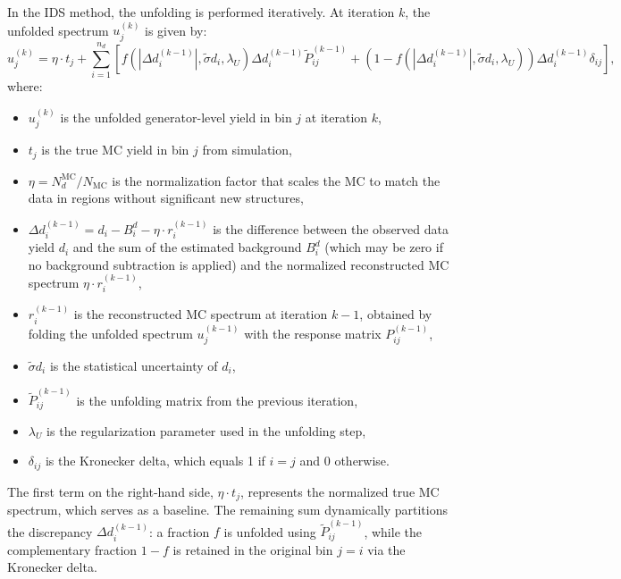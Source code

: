 In the IDS method, the unfolding is performed iteratively. At iteration $k$,
the unfolded spectrum $u_j^{(k)}$ is given by:
\begin{equation}
    u_j^{(k)} = \eta \cdot t_j + \sum_{i=1}^{n_d} \left[ f\left(|\Delta d_i^{(k-1)}|, \tilde{\sigma} d_i, \lambda_U\right) \Delta d_i^{(k-1)} \tilde{P}_{ij}^{(k-1)} + \left(1 - f\left(|\Delta d_i^{(k-1)}|, \tilde{\sigma} d_i, \lambda_U\right)\right) \Delta d_i^{(k-1)} \delta_{ij} \right],
    \label{eq:ids_unfolding}
\end{equation}
where:
\begin{itemize}
    \item $u_j^{(k)}$ is the unfolded generator-level yield in bin $j$ at iteration $k$,
    \item $t_j$ is the true MC yield in bin $j$ from simulation,
    \item $\eta = N_d^{\text{MC}} / N_{\text{MC}}$ is the normalization factor that scales the MC to match the data in regions without significant new structures,
    \item $\Delta d_i^{(k-1)} = d_i - B_i^d - \eta \cdot r_i^{(k-1)}$ is the difference between the observed data yield $d_i$ and the sum of the estimated background $B_i^d$ (which may be zero if no background subtraction is applied) and the normalized reconstructed MC spectrum $\eta \cdot r_i^{(k-1)}$,
    \item $r_i^{(k-1)}$ is the reconstructed MC spectrum at iteration $k-1$, obtained by folding the unfolded spectrum $u_j^{(k-1)}$ with the response matrix $P_{ij}^{(k-1)}$,
    \item $\tilde{\sigma} d_i$ is the statistical uncertainty of $d_i$,
    \item $\tilde{P}_{ij}^{(k-1)}$ is the unfolding matrix from the previous iteration,
    \item $\lambda_U$ is the regularization parameter used in the unfolding step,
    \item $\delta_{ij}$ is the Kronecker delta, which equals 1 if $i=j$ and 0 otherwise.
\end{itemize}
The first term on the right-hand side, $\eta \cdot t_j$, represents the normalized true MC spectrum, which serves as a baseline. The remaining sum dynamically partitions the discrepancy $\Delta d_i^{(k-1)}$: a fraction $f$ is unfolded using $\tilde{P}_{ij}^{(k-1)}$, while the complementary fraction $1-f$ is retained in the original bin $j=i$ via the Kronecker delta.

